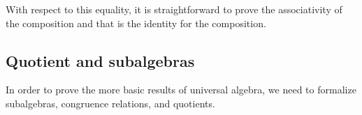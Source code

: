 \noindent With respect to this equality, it is straightforward to
prove the associativity of the composition \AgdaUnderscore{}\AgdaUnderscore{} and that
 is
the identity for the composition.



\subsection{Quotient and subalgebras}
In order to prove the more basic results of universal algebra, we need
to formalize subalgebras, congruence relations, and quotients.


